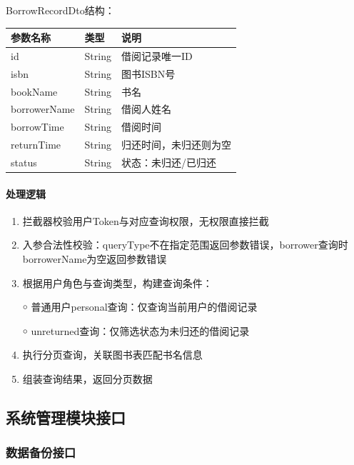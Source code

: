 \documentclass[12pt, a4paper]{article}
\begin{document}
BorrowRecordDto结构：

\begin{table}[H]
    \centering
    \begin{tabular}{|l|l|l|}
        \hline
        参数名称 & 类型 & 说明 \\
        \hline
        id & String & 借阅记录唯一ID \\
        \hline
        isbn & String & 图书ISBN号 \\
        \hline
        bookName & String & 书名 \\
        \hline
        borrowerName & String & 借阅人姓名 \\
        \hline
        borrowTime & String & 借阅时间 \\
        \hline
        returnTime & String & 归还时间，未归还则为空 \\
        \hline
        status & String & 状态：未归还/已归还 \\
        \hline
    \end{tabular}
\end{table}

\paragraph{处理逻辑}
\begin{enumerate}
\item 拦截器校验用户Token与对应查询权限，无权限直接拦截

\item 入参合法性校验：queryType不在指定范围返回参数错误，borrower查询时borrowerName为空返回参数错误

\item 根据用户角色与查询类型，构建查询条件：

￮ 普通用户personal查询：仅查询当前用户的借阅记录

￮ unreturned查询：仅筛选状态为未归还的借阅记录

\item 执行分页查询，关联图书表匹配书名信息

\item 组装查询结果，返回分页数据
\end{enumerate}

\subsection{系统管理模块接口}

\subsubsection{数据备份接口}
\end{document}
